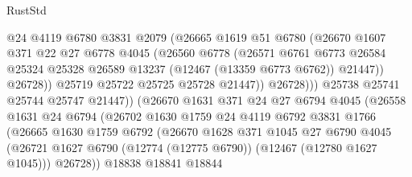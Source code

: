 \begin{lexlean}{RustStd}
\begin{coremodule}
                              @24
                              @4119
                              @6780
                              @3831
                              @2079
                              (@26665
                                @1619
                                @51
                                @6780
                                (@26670
                                  @1607
                                  @371
                                  @22
                                  @27
                                  @6778
                                  @4045
                                  (@26560
                                    @6778
                                    (@26571
                                      @6761
                                      @6773
                                      @26584
                                      @25324
                                      @25328
                                      @26589
                                      @13237
                                      (@12467 (@13359 @6773 @6762))
                                      @21447))
                                  @26728))
                              @25719
                              @25722
                              @25725
                              @25728
                              @21447))
                          @26728)))
                    @25738
                    @25741
                    @25744
                    @25747
                    @21447))
                (@26670
                  @1631
                  @371
                  @24
                  @27
                  @6794
                  @4045
                  (@26558
                    @1631
                    @24
                    @6794
                    (@26702
                      @1630
                      @1759
                      @24
                      @4119
                      @6792
                      @3831
                      @1766
                      (@26665
                        @1630
                        @1759
                        @6792
                        (@26670
                          @1628
                          @371
                          @1045
                          @27
                          @6790
                          @4045
                          (@26721 @1627 @6790 (@12774 (@12775 @6790)) (@12467 (@12780 @1627 @1045)))
                          @26728))
                      @18838
                      @18841
                      @18844

\end{coremodule}
\end{lexlean}
